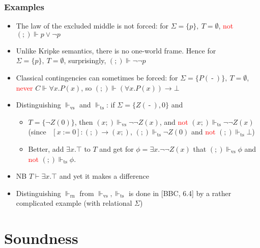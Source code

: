 \documentclass[handout,11pt]{beamer}
\newcommand{\red}[1]{\textcolor{red}{#1}}
\newcommand{\set}[1]{\{#1\}}
\newcommand{\es}{\emptyset}
\newcommand*{\subvs}{_{\mathrm{vs}}}
\newcommand*{\subrn}{_{\mathrm{rn}}}
\newcommand*{\subts}{_{\mathrm{ts}}}
\newcommand{\Fts}{\Vdash\subts}
\newcommand{\Fvs}{\Vdash\subvs}
\newcommand{\Frn}{\Vdash\subrn}
\newcommand{\blank}{\mathord{\operatorname{-}}} %
\begin{document}
\begin{frame}
\frametitle{Examples}
 \begin{itemize}[<+->]
    \item The law of the excluded middle is not forced:
    for $\Sigma=\set{p},~T=\es$, \red{not} $(;)\Vdash p\lor\neg p$
    \item Unlike Kripke semantics, there is no one-world frame. Hence
    for $\Sigma=\set{p},~T=\es$, surprisingly, $(;)\Vdash \neg\neg p$
    \item Classical contingencies can sometimes be forced:
    for $\Sigma=\set{P(\blank)},~T=\es$, \red{never} $C\Vdash \forall x. P(x)$,
    so $(;)\Vdash (\forall x. P(x))\to\bot$
    \item Distinguishing $\Fvs$ and $\Fts$: if $\Sigma=\set{Z(\blank),0}$ and
    \begin{itemize}[<+->]
     \item $T=\set{\neg Z(0)}$, then $(x;)\Fvs\neg\neg Z(x)$,
     and \red{not} $(x;)\Fts\neg\neg Z(x)$ (since  $[x:=0] : (;)\to(x;)$,
     $(;)\Fts \neg Z(0)$ and \red{not} $(;)\Fts \bot$)
     \item Better, add $\exists x.\top$ to $T$ and get for
     $\phi= \exists x.\neg\neg Z(x)$ that $(;)\Fvs \phi$ 
     and \red{not} $(;)\Fts\phi$.
    \end{itemize}
    \item NB $T\vdash\exists x.\top$ and yet it makes a difference
    \item Distinguishing $\Frn$ from $\Fvs,\Fts$ is done in [BBC, 6.4]
    by a rather complicated example (with relational $\Sigma$)
 \end{itemize}
\end{frame}

\section{Soundness}
\end{document}
